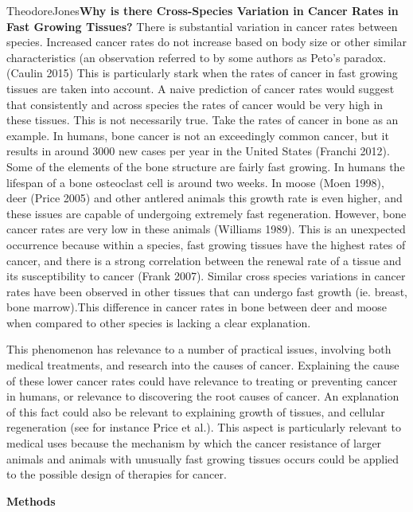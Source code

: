 \documentclass[12pt,letterpaper]{article}
\begin{document}
\begin{mla}{Theodore}{Jones}{}{}{}{\textbf{Why is there Cross-Species Variation in Cancer Rates in Fast Growing Tissues?}}
There is substantial variation in cancer rates between species. Increased cancer rates do not increase based on body size or other similar characteristics (an observation referred to by some authors as Peto’s paradox. (Caulin 2015) This is particularly stark when the rates of cancer in fast growing tissues are taken into account. A naive prediction of cancer rates would suggest that consistently and across species the rates of cancer would be very high in these tissues. This is not necessarily true. Take the rates of cancer in bone as an example. In humans, bone cancer is not an exceedingly common cancer, but it results in around 3000 new cases per year in the United States (Franchi 2012). Some of the elements of the bone structure are fairly fast growing. In humans the lifespan of a bone osteoclast cell is around two weeks. In moose (Moen 1998), deer (Price 2005) and other antlered animals this growth rate is even higher, and these issues are capable of undergoing extremely fast regeneration. However, bone cancer rates are very low in these animals (Williams 1989). This is an unexpected occurrence because within a species, fast growing tissues have the highest rates of cancer, and there is a strong correlation between the renewal rate of a tissue and its susceptibility to cancer (Frank 2007). Similar cross species variations in cancer rates have been observed in other tissues that can undergo fast growth (ie. breast, bone marrow).This difference in cancer rates in bone between deer and moose when compared to other species is lacking a clear explanation. 

This phenomenon has relevance to a number of practical issues, involving both medical treatments, and research into the causes of cancer. Explaining the cause of these lower cancer rates could have relevance to treating or preventing cancer in humans, or relevance to discovering the root causes of cancer. An explanation of this fact could also be relevant to explaining growth of tissues, and cellular regeneration (see for instance Price et al.). This aspect is particularly relevant to medical uses because the mechanism by which the cancer resistance of larger animals and animals with unusually fast growing tissues occurs could be applied to the possible design of therapies for cancer. 

\textbf{Methods} \\


\end{mla}
\end{document}
